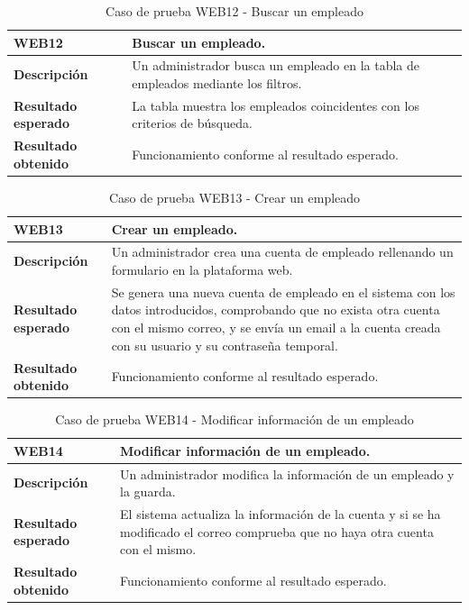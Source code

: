     \begin{table}[H]
        \centering
        \begin{tabular}{|l|p{12cm}|}
        \hline
        \textbf{WEB12} & Buscar un empleado. \\ \hline
        \textbf{Descripción} & Un administrador busca un empleado en la tabla de empleados mediante los filtros. \\ \hline
        \textbf{Resultado esperado} & La tabla muestra los empleados coincidentes con los criterios de búsqueda. \\ \hline
        \textbf{Resultado obtenido} & Funcionamiento conforme al resultado esperado. \\ \hline
        \end{tabular}
        \caption{Caso de prueba WEB12 - Buscar un empleado}
    \end{table}

    \begin{table}[H]
        \centering
        \begin{tabular}{|l|p{12cm}|}
        \hline
        \textbf{WEB13} & Crear un empleado. \\ \hline
        \textbf{Descripción} & Un administrador crea una cuenta de empleado rellenando un formulario en la plataforma web. \\ \hline
        \textbf{Resultado esperado} & Se genera una nueva cuenta de empleado en el sistema con los datos introducidos, comprobando que no exista otra cuenta con el mismo correo, y se envía un email a la cuenta creada con su usuario y su contraseña temporal. \\ \hline
        \textbf{Resultado obtenido} & Funcionamiento conforme al resultado esperado. \\ \hline
        \end{tabular}
        \caption{Caso de prueba WEB13 - Crear un empleado}
    \end{table}

    \begin{table}[H]
        \centering
        \begin{tabular}{|l|p{12cm}|}
        \hline
        \textbf{WEB14} & Modificar información de un empleado. \\ \hline
        \textbf{Descripción} & Un administrador modifica la información de un empleado y la guarda. \\ \hline
        \textbf{Resultado esperado} & El sistema actualiza la información de la cuenta y si se ha modificado el correo comprueba que no haya otra cuenta con el mismo. \\ \hline
        \textbf{Resultado obtenido} & Funcionamiento conforme al resultado esperado. \\ \hline
        \end{tabular}
        \caption{Caso de prueba WEB14 - Modificar información de un empleado}
    \end{table}

